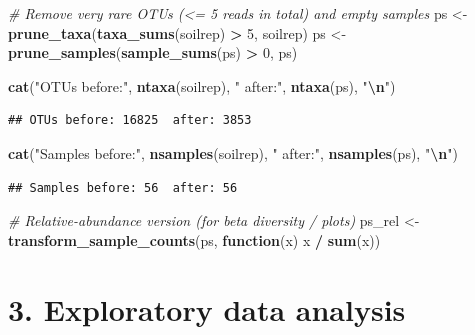 \documentclass[
]{article}
\newenvironment{Shaded}{\begin{snugshade}}{\end{snugshade}}
\newcommand{\CommentTok}[1]{\textcolor[rgb]{0.56,0.35,0.01}{\textit{#1}}}
\newcommand{\ControlFlowTok}[1]{\textcolor[rgb]{0.13,0.29,0.53}{\textbf{#1}}}
\newcommand{\DecValTok}[1]{\textcolor[rgb]{0.00,0.00,0.81}{#1}}
\newcommand{\FunctionTok}[1]{\textcolor[rgb]{0.13,0.29,0.53}{\textbf{#1}}}
\newcommand{\NormalTok}[1]{#1}
\newcommand{\OtherTok}[1]{\textcolor[rgb]{0.56,0.35,0.01}{#1}}
\newcommand{\SpecialCharTok}[1]{\textcolor[rgb]{0.81,0.36,0.00}{\textbf{#1}}}
\newcommand{\StringTok}[1]{\textcolor[rgb]{0.31,0.60,0.02}{#1}}
\begin{document}
\begin{Shaded}
\begin{Highlighting}[]
\CommentTok{\# Remove very rare OTUs (\textless{}= 5 reads in total) and empty samples}
\NormalTok{ps }\OtherTok{\textless{}{-}} \FunctionTok{prune\_taxa}\NormalTok{(}\FunctionTok{taxa\_sums}\NormalTok{(soilrep) }\SpecialCharTok{\textgreater{}} \DecValTok{5}\NormalTok{, soilrep)}
\NormalTok{ps }\OtherTok{\textless{}{-}} \FunctionTok{prune\_samples}\NormalTok{(}\FunctionTok{sample\_sums}\NormalTok{(ps) }\SpecialCharTok{\textgreater{}} \DecValTok{0}\NormalTok{, ps)}

\FunctionTok{cat}\NormalTok{(}\StringTok{"OTUs before:"}\NormalTok{, }\FunctionTok{ntaxa}\NormalTok{(soilrep), }\StringTok{" after:"}\NormalTok{, }\FunctionTok{ntaxa}\NormalTok{(ps), }\StringTok{"}\SpecialCharTok{\textbackslash{}n}\StringTok{"}\NormalTok{)}
\end{Highlighting}
\end{Shaded}

\begin{verbatim}
## OTUs before: 16825  after: 3853
\end{verbatim}

\begin{Shaded}
\begin{Highlighting}[]
\FunctionTok{cat}\NormalTok{(}\StringTok{"Samples before:"}\NormalTok{, }\FunctionTok{nsamples}\NormalTok{(soilrep), }\StringTok{" after:"}\NormalTok{, }\FunctionTok{nsamples}\NormalTok{(ps), }\StringTok{"}\SpecialCharTok{\textbackslash{}n}\StringTok{"}\NormalTok{)}
\end{Highlighting}
\end{Shaded}

\begin{verbatim}
## Samples before: 56  after: 56
\end{verbatim}

\begin{Shaded}
\begin{Highlighting}[]
\CommentTok{\# Relative{-}abundance version (for beta diversity / plots)}
\NormalTok{ps\_rel }\OtherTok{\textless{}{-}} \FunctionTok{transform\_sample\_counts}\NormalTok{(ps, }\ControlFlowTok{function}\NormalTok{(x) x }\SpecialCharTok{/} \FunctionTok{sum}\NormalTok{(x))}
\end{Highlighting}
\end{Shaded}

\section{3. Exploratory data analysis}\label{exploratory-data-analysis}
\end{document}
